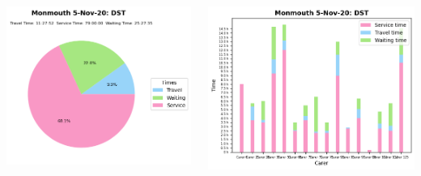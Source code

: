 \documentclass[usenames,dvipsnames]{beamer}
\begin{document}
\begin{frame}
\begin{columns}
\begin{minipage}[c][0.45\textheight][c]{\linewidth}
		\end{minipage}
		\begin{minipage}[c][0.45\textheight][c]{\linewidth}
			\centering
			\includegraphics[width=1\linewidth]{figures/5_Nov_20_Monmouth_time_info_dst}
		\end{minipage}
		\begin{minipage}[c][0.45\textheight][c]{\linewidth}
			\vspace{5mm}
			\centering
			\includegraphics[width=1\linewidth]{figures/5_Nov_20_Monmouth_workload_dst}
		\end{minipage}
	\end{columns}
\end{frame}
\end{document}
